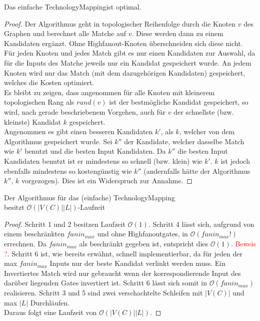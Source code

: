 \documentclass[11pt, a4paper, german]{article}
\newcommand{\TM}{TechnologyMapping}
\begin{document}
\begin{cor}
	Das einfache \TM ist optimal. 
\end{cor}
\begin{proof}
	Der Algorithmus geht in topologischer Reihenfolge durch die Knoten $v$ des Graphen und berechnet alle Matche auf $v$. Diese werden dann zu einem Kandidaten ergänzt. 
 Ohne Highfanout-Knoten überschneiden sich diese nicht. Für jeden Knoten und jedes Match gibt es nur einen Kandidaten zur Auswahl, da für die Inputs des Matche jeweils nur ein Kandidat gespeichert wurde. An jedem Knoten wird nur das Match (mit dem dazugehörigen Kandidaten) gespeichert, welches die Kosten optimiert. \\
 Es bleibt zu zeigen, dass angenommen für alle Knoten mit kleinerem topologischen Rang als $rand(v)$ ist der bestmögliche Kandidat gespeichert, so wird, nach gerade beschriebenem Vorgehen, auch für $v$ der schnellste (bzw. kleinste) Kandidat $k$ gespeichert. \\
 Angenommen es gibt einen besseren Kandidaten $k'$, als $k$, welcher von dem Algorithmus gespeichert wurde. Sei $k''$ der Kandidate, welcher dasselbe Match wie $k'$ benutzt und die besten Input Kandidaten. Da $k''$ die besten Input Kandidaten benutzt ist er mindestens so schnell (bzw. klein) wie $k'$. $k$ ist jedoch ebenfalls mindestens so kostengünstig wie $k''$ (andernfalls hätte der Algorithmus $k''$, $k$ vorgezogen). Dies ist ein Widerspruch zur Annahme. 
\end{proof}
 
\begin{cor}{Der Algorithmus für das (einfache) \TM  \\ besitzt $\mathcal{O}(  |V(C)||L|)$-Laufzeit}
\end{cor}
\begin{proof}
Schritt 1 und 2 besitzen Laufzeit $\mathcal{O}(1)$. Schritt 4 lässt sich, aufgrund von einem beschränkten $fanin_{max}$ und ohne Highfanoutgates, in $\mathcal{O}(fanin_{max}!)$ errechnen. Da $fanin_{max}$ als beschränkt gegeben ist, entspricht dies  $\mathcal{O}(1)$. \textcolor{red}{Beweis ?}. Schritt 6 ist, wie bereits erwähnt, schnell implementierbar, da für jeden der max $fanin_{max}$ Inputs nur der beste Kandidat verlinkt werden muss. Ein Invertiertes Match wird nur gebraucht wenn der korrespondierende Input des darüber liegenden Gates invertiert ist. Schritt 6 lässt sich somit in  $\mathcal{O}(fanin_{max})$ realisieren. Schritt 3 und 5 sind zwei verschachtelte Schleifen mit  $|V(C)|$ und max $|L|$ Durchläufen. \\
Daraus folgt eine Laufzeit von $\mathcal{O}(  |V(C)||L|)$.
\end{proof}
\end{document}
